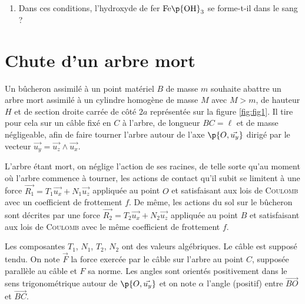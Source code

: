 \documentclass[a4paper,french,bookmarks]{article}
\begin{document}
\begin{enumerate}[resume]
        \noafter
        \nobefore\yesafter
        \yesbefore

        \item Dans ces conditions, l'hydroxyde de fer $\text{Fe}\p{\text O\text H}_3$ se forme-t-il dans le sang ?

    \end{enumerate}
    
    \newpage
    
    \section{Chute d'un arbre mort}
    
    Un bûcheron assimilé à un point matériel $B$ de masse $m$ souhaite abattre un arbre mort assimilé à un cylindre homogène de masse $M$ avec $M > m$, de hauteur $H$ et de section droite carrée de côté $2a$ représentée sur la figure \ref{fig:fig1}. Il tire pour cela sur un câble fixé en $C$ à l'arbre, de longueur $BC = \ell$ et de masse négligeable, afin de faire tourner l'arbre autour de l'axe $\p{O, \vec{u_y}}$ dirigé par le vecteur $\vec{u_y} = \vec{u_z} \wedge \vec{u_x}$.\medskip
    
    L'arbre étant mort, on néglige l'action de ses racines, de telle sorte qu'au moment où l'arbre commence à tourner, les actions de contact qu'il subit se limitent à une force $\vec{R_1} = T_1\vec{u_x} + N_1\vec{u_z}$ appliquée au point $O$ et satisfaisant aux lois de \textsc{Coulomb} avec un coefficient de frottement $f$. De même, les actions du sol sur le bûcheron sont décrites par une force $\vec{R_2} = T_2\vec{u_x} + N_2\vec{u_z}$ appliquée au point $B$ et satisfaisant aux lois de \textsc{Coulomb} avec le même coefficient de frottement $f$.\medskip
    
    Les composantes $T_1$, $N_1$, $T_2$, $N_2$ ont des valeurs algébriques. Le câble est supposé tendu. On note $\vec{F}$ la force exercée par le câble sur l'arbre au point $C$, supposée parallèle au câble et $F$ sa norme. Les angles sont orientés positivement dans le sens trigonométrique autour de $\p{O, \vec{u_y}}$ et on note $\alpha$ l'angle (positif) entre $\vec{BO}$ et $\vec{BC}$.
    
\end{document}
